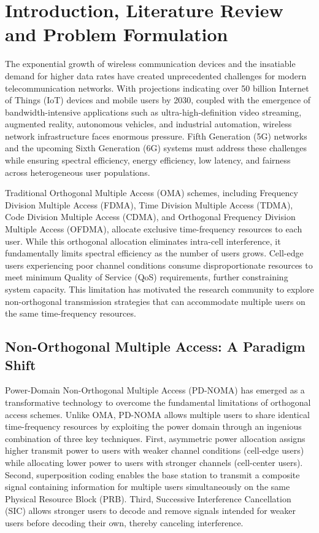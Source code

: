 \chapter{Introduction, Literature Review and Problem Formulation}
\label{chap:introduction}

The exponential growth of wireless communication devices and the insatiable demand for higher data rates have created unprecedented challenges for modern telecommunication networks. With projections indicating over 50 billion Internet of Things (IoT) devices and mobile users by 2030, coupled with the emergence of bandwidth-intensive applications such as ultra-high-definition video streaming, augmented reality, autonomous vehicles, and industrial automation, wireless network infrastructure faces enormous pressure. Fifth Generation (5G) networks and the upcoming Sixth Generation (6G) systems must address these challenges while ensuring spectral efficiency, energy efficiency, low latency, and fairness across heterogeneous user populations.

Traditional Orthogonal Multiple Access (OMA) schemes, including Frequency Division Multiple Access (FDMA), Time Division Multiple Access (TDMA), Code Division Multiple Access (CDMA), and Orthogonal Frequency Division Multiple Access (OFDMA), allocate exclusive time-frequency resources to each user. While this orthogonal allocation eliminates intra-cell interference, it fundamentally limits spectral efficiency as the number of users grows. Cell-edge users experiencing poor channel conditions consume disproportionate resources to meet minimum Quality of Service (QoS) requirements, further constraining system capacity. This limitation has motivated the research community to explore non-orthogonal transmission strategies that can accommodate multiple users on the same time-frequency resources.

\section{Non-Orthogonal Multiple Access: A Paradigm Shift}

Power-Domain Non-Orthogonal Multiple Access (PD-NOMA) has emerged as a transformative technology to overcome the fundamental limitations of orthogonal access schemes. Unlike OMA, PD-NOMA allows multiple users to share identical time-frequency resources by exploiting the power domain through an ingenious combination of three key techniques. First, asymmetric power allocation assigns higher transmit power to users with weaker channel conditions (cell-edge users) while allocating lower power to users with stronger channels (cell-center users). Second, superposition coding enables the base station to transmit a composite signal containing information for multiple users simultaneously on the same Physical Resource Block (PRB). Third, Successive Interference Cancellation (SIC) allows stronger users to decode and remove signals intended for weaker users before decoding their own, thereby canceling interference.

